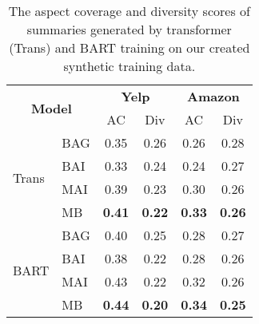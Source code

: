 \begin{table}[th]
	\centering
	\small
	\begin{tabular}{|l|l|c|c|c|c|}
		\hline
		\multicolumn{2}{|c|}{\multirow{2}{*}{\bf Model}} & \multicolumn{2}{c|}{\bf Yelp} &  \multicolumn{2}{c|}{\bf Amazon} \\ \cline{3-6}
		\multicolumn{2}{|c|}{} & AC & Div & AC & Div \\
		\hline
		\multirow{4}{*}{Trans} & BAG & 0.35 & 0.26  & 0.26& 0.28 \\
		& BAI & 0.33 & 0.24 &0.24 & 0.27 \\
		& MAI & 0.39&  0.23 & 0.30 & 0.26 \\
		& MB & \bf 0.41 & \bf 0.22 & \bf 0.33 & \bf 0.26\\
		\hline
		\multirow{4}{*}{BART} & BAG &0.40 & 0.25 &0.28 & 0.27 \\
		& BAI & 0.38 & 0.22 & 0.28 & 0.26 \\
		& MAI & 0.43 & 0.22 & 0.32 & 0.26 \\
		& MB & \bf 0.44 & \bf 0.20 &\bf 0.34 & \bf 0.25 \\
		\hline
	\end{tabular}
	\caption{The aspect coverage and diversity scores of summaries generated by transformer (Trans) and BART training on our created synthetic training data.
	}\label{tab:acdv}  
\end{table}







